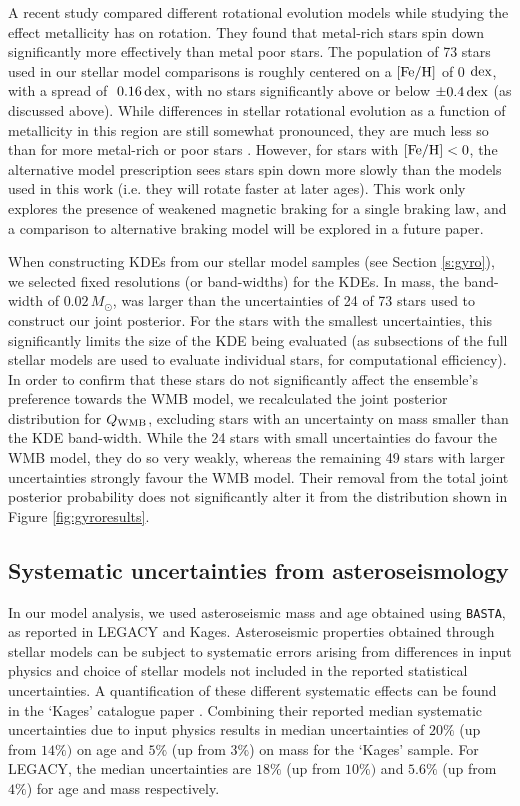 \documentclass[12pt]{article}
\newcommand{\feh}{\mbox{$\rm{[Fe/H]}$}\xspace}
\begin{document}
A recent study \cite{m_amard+matt2020} compared different rotational evolution models \cite[of which we use the former in this work]{m_vansaders+pinsonneault2013,m_matt+2015} while studying the effect metallicity has on rotation. They found that metal-rich stars spin down significantly more effectively than metal poor stars. The population of 73 stars used in our stellar model comparisons is roughly centered on a $\rm{[Fe/H]}$ of 0 $\rm dex$, with a spread of $~0.16\, \rm dex$, with no stars significantly above or below $\pm 0.4\, \rm dex$ (as discussed above). While differences in stellar rotational evolution as a function of metallicity in this region are still somewhat pronounced, they are much less so than for more metal-rich or poor stars \cite[see Figure 2]{m_amard+matt2020}. However, for stars with $\feh < 0$, the alternative model prescription \cite{m_matt+2015} sees stars spin down more slowly than the models used in this work (i.e. they will rotate faster at later ages). This work only explores the presence of weakened magnetic braking for a single braking law, and a comparison to alternative braking model will be explored in a future paper.

When constructing KDEs from our stellar model samples (see Section \ref{s:gyro}), we selected fixed resolutions (or band-widths) for the KDEs. In mass, the band-width of $0.02\, M_\odot$, was larger than the uncertainties of 24 of 73 stars used to construct our joint posterior. For the stars with the smallest uncertainties, this significantly limits the size of the KDE being evaluated (as subsections of the full stellar models are used to evaluate individual stars, for computational efficiency). In order to confirm that these stars do not significantly affect the ensemble's preference towards the WMB model, we recalculated the joint posterior distribution for $Q_{\rm WMB}$, excluding stars with an uncertainty on mass smaller than the KDE band-width. While the 24 stars with small uncertainties do favour the WMB model, they do so very weakly, whereas the remaining 49 stars with larger uncertainties strongly favour the WMB model. Their removal from the total joint posterior probability does not significantly alter it from the distribution shown in Figure \ref{fig:gyroresults}.

\subsection{Systematic uncertainties from asteroseismology}
In our model analysis, we used asteroseismic mass and age obtained using \texttt{BASTA}, as reported in LEGACY and Kages. Asteroseismic properties obtained through stellar models can be subject to systematic errors arising from differences in input physics and choice of stellar models not included in the reported statistical uncertainties. A quantification of these different systematic effects can be found in the `Kages' catalogue paper \cite{m_silvaaguirre+2015}. Combining their reported median systematic uncertainties due to input physics results in median uncertainties of $20\%$ (up from $14\%)$ on age and $5\%$ (up from $3\%$) on mass for the `Kages' sample. For LEGACY, the median uncertainties are $18\%$ (up from $10\%)$ and $5.6\%$ (up from $4\%$) for age and mass respectively.
\end{document}
